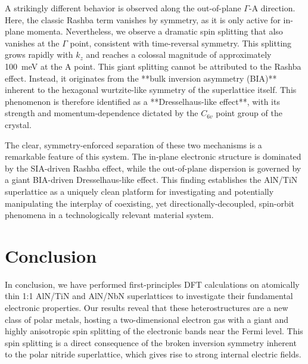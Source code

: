 \documentclass[aps,prl,reprint,superscriptaddress]{revtex4-2}
\begin{document}
A strikingly different behavior is observed along the out-of-plane $\Gamma$-A direction. Here, the classic Rashba term vanishes by symmetry, as it is only active for in-plane momenta. Nevertheless, we observe a dramatic spin splitting that also vanishes at the $\Gamma$ point, consistent with time-reversal symmetry. This splitting grows rapidly with $k_z$ and reaches a colossal magnitude of approximately 100~meV at the A point. This giant splitting cannot be attributed to the Rashba effect. Instead, it originates from the **bulk inversion asymmetry (BIA)** inherent to the hexagonal wurtzite-like symmetry of the superlattice itself. This phenomenon is therefore identified as a **Dresselhaus-like effect**, with its strength and momentum-dependence dictated by the $C_{6v}$ point group of the crystal.

The clear, symmetry-enforced separation of these two mechanisms is a remarkable feature of this system. The in-plane electronic structure is dominated by the SIA-driven Rashba effect, while the out-of-plane dispersion is governed by a giant BIA-driven Dresselhaus-like effect. This finding establishes the AlN/TiN superlattice as a uniquely clean platform for investigating and potentially manipulating the interplay of coexisting, yet directionally-decoupled, spin-orbit phenomena in a technologically relevant material system.




\section{Conclusion}
In conclusion, we have performed first-principles DFT calculations on atomically thin 1:1 AlN/TiN and AlN/NbN superlattices to investigate their fundamental electronic properties. Our results reveal that these heterostructures are a new class of polar metals, hosting a two-dimensional electron gas with a giant and highly anisotropic spin splitting of the electronic bands near the Fermi level. This spin splitting is a direct consequence of the broken inversion symmetry inherent to the polar nitride superlattice, which gives rise to strong internal electric fields.
\end{document}
